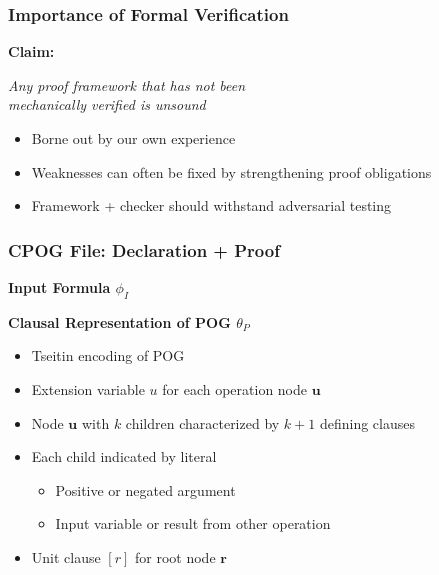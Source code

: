 \documentclass[t,pdf]{beamer}
\newcommand{\bitem}{\item[$\bullet$]}
\newcommand{\makenode}[1]{{\mathbf #1}}
\newcommand{\nodeu}{\makenode{u}}
\newcommand{\noder}{\makenode{r}}
\begin{document}
\begin{frame}
\frametitle{Importance of Formal Verification}

\bigskip
    {\bf Claim:}
    
\medskip
\begin{center}
{\em\Large Any proof framework that has not been \\[0.3em] mechanically verified is unsound}
\end{center}
\medskip

         \begin{itemize}
           \item Borne out by our own experience
           \item Weaknesses can often be fixed by strengthening proof obligations
           \item Framework + checker should withstand adversarial testing
         \end{itemize}

\end{frame}


\begin{frame}
\frametitle{CPOG File: Declaration + Proof}
           \medskip

           {\bf Input Formula $\phi_I$}

           \medskip
           
           {\bf Clausal Representation of POG $\theta_P$}
           \begin{itemize}
             \item Tseitin encoding of POG
             \item Extension variable $u$ for each operation node  $\nodeu$
             \item Node $\nodeu$ with $k$ children characterized  by $k+1$ defining clauses
             \item Each child indicated by literal
               \begin{itemize}
                 \bitem Positive or negated argument
                 \bitem Input variable or result from other operation
               \end{itemize}
             \item Unit clause $[r]$ for root node $\noder$
           \end{itemize}

           \medskip



\end{frame}
\end{document}
